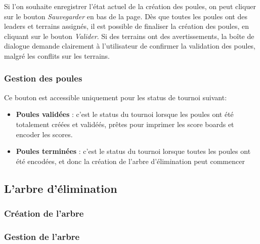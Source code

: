 Si l'on souhaite enregistrer l'état actuel de la création des poules, on peut cliquer sur le bouton \textit{Sauvegarder} en bas de la page. Dès que toutes les poules ont des leaders et terrains assignés, il est possible de finaliser la création des poules, en cliquant sur le bouton \textit{Valider}. Si des terrains ont des avertissements, la boîte de dialogue demande clairement à l'utilisateur de confirmer la validation des poules, malgré les conflits sur les terrains.

\subsubsection{Gestion des poules}

Ce bouton est accessible uniquement pour les status de tournoi suivant:
\begin{itemize}
\item \textbf{Poules validées} : c'est le status du tournoi lorsque les poules ont été totalement créées et validéés, prêtes pour imprimer les score boards et encoder les scores.
\item \textbf{Poules terminées} : c'est le status du tournoi lorsque toutes les poules ont été encodées, et donc la création de l'arbre d'élimination peut commencer
\end{itemize}

\subsection{L'arbre d'élimination}

\subsubsection{Création de l'arbre}

\subsubsection{Gestion de l'arbre}
